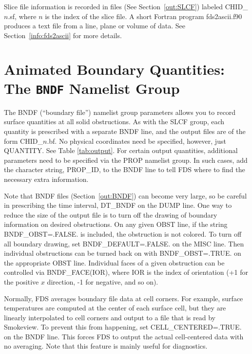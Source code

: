 \documentclass[11pt]{book}
\begin{document}
Slice file information is recorded in files (See Section~\ref{out:SLCF})
labeled {\ct CHID\_$n$.sf}, where $n$ is the index of the slice file.
A short Fortran program {\ct fds2ascii.f90} produces a text file from a line,
plane or volume of data. See Section~\ref{info:fds2ascii} for more details.






\section{Animated Boundary Quantities: The \texorpdfstring{{\tt BNDF}}{BNDF} Namelist Group}
\label{info:BNDF}

The {\ct BNDF} (``boundary file'') namelist group parameters allows you
to record surface quantities at all solid obstructions. As with
the {\ct SLCF} group, each quantity is prescribed with a separate
{\ct BNDF} line, and the output files are of the form {\ct CHID\_$n$.bf}.
No physical coordinates need be specified, however, just {\ct QUANTITY}.
See Table \ref{tab:output}. For certain output quantities, additional parameters need to be specified via
the {\ct PROP} namelist group. In such cases, add the character string, {\ct PROP\_ID}, to the {\ct BNDF} line
to tell FDS where to find the necessary extra information.

Note that {\ct BNDF} files (Section~\ref{out:BNDF}) can become very
large, so be careful in prescribing the time interval, {\ct DT\_BNDF} on the {\ct DUMP} line.
One way to reduce the size of the output file is to turn off the
drawing of boundary information on desired obstructions. On any given
{\ct OBST} line, if the string {\ct BNDF\_OBST=.FALSE.} is included,
the obstruction is not colored. To turn off all boundary drawing,
set {\ct BNDF\_DEFAULT=.FALSE.} on the {\ct MISC} line. Then individual
obstructions can be turned back on with {\ct BNDF\_OBST=.TRUE.} on
the appropriate {\ct OBST} line. Individual faces of a given obstruction can be controlled
via {\ct BNDF\_FACE(IOR)}, where {\ct IOR} is the index of orientation (+1 for the positive $x$ direction, -1 for negative, and so on).

Normally, FDS averages boundary file data at cell corners. For example, surface temperatures are computed at the center of each surface cell, but they
are linearly interpolated to cell corners and output to a file that is read by Smokeview. To prevent this from happening,
set {\ct CELL\_CENTERED=.TRUE.} on the {\ct BNDF} line. This forces FDS to output the actual cell-centered data with no averaging. Note that this
feature is mainly useful for diagnostics.
\end{document}
